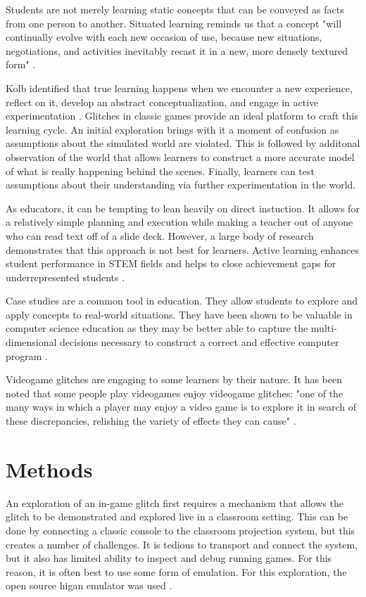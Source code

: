 \documentclass[letterpaper]{article}
\begin{document}
Students are not merely learning static concepts that can be conveyed as facts from one person to another. Situated learning reminds us that a concept "will continually evolve with each new occasion of use, because new situations, negotiations, and activities inevitably recast it in a new, more densely textured form" \cite{brown1989situated}.

Kolb identified that true learning happens when we encounter a new experience, reflect on it, develop an abstract conceptualization, and engage in active experimentation \cite{kolb84}. Glitches in classic games provide an ideal platform to craft this learning cycle. An initial exploration brings with it a moment of confusion as assumptions about the simulated world are violated. This is followed by additonal observation of the world that allows learners to construct a more accurate model of what is really happening behind the scenes. Finally, learners can test assumptions about their understanding via further experimentation in the world.

As educators, it can be tempting to lean heavily on direct instuction. It allows for a relatively simple planning and execution while making a teacher out of anyone who can read text off of a slide deck. However, a large body of research demonstrates that this approach is not best for learners. Active learning enhances student performance in STEM fields \cite{freeman2014active} and helps to close achievement gaps for underrepresented students \cite{theobald2020active}.

Case studies are a common tool in education. They allow students to explore and apply concepts to real-world situations. They have been shown to be valuable in computer science education as they may be better able to capture the multi-dimensional decisions necessary to construct a correct and effective computer program \cite{linn1992case}.

Videogame glitches are engaging to some learners by their nature. It has been noted that some people play videogames enjoy videogame glitches: "one of the many ways in which a player may enjoy a video game is to explore it in search of these discrepancies, relishing the variety of effects they can cause" \cite{bainbridge2007creative}.

\section{Methods}
An exploration of an in-game glitch first requires a mechanism that allows the glitch to be demonstrated and explored live in a classroom setting. This can be done by connecting a classic console to the classroom projection system, but this creates a number of challenges. It is tedious to transport and connect the system, but it also has limited ability to inspect and debug running games. For this reason, it is often best to use some form of emulation. For this exploration, the open source higan emulator was used \cite{ginder2004higan}.
\end{document}
